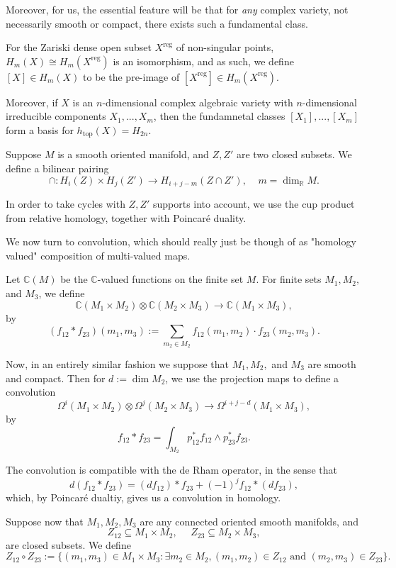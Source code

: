 \documentclass{memoir}
\newcommand{\w}{\wedge}
\newcommand{\bc}{\mathbb{C}}
\newcommand{\br}{\mathbb{R}}
\newcommand{\tx}{\text}
\newcommand{\ten}{\otimes}
\theoremstyle{definition}
\begin{document}
	Moreover, for us, the essential feature will be that for \emph{any} complex variety, not necessarily smooth or compact, there exists such a fundamental class.  
	
	For the Zariski dense open subset $X^{\tx{reg}}$ of non-singular points, $H_m(X)\cong H_m(X^{\tx{reg}})$ is an isomorphism, and as such, we define $[X]\in H_m(X)$ to be the pre-image of $[X^{\tx{reg}}]\in H_m(X^{\tx{reg}})$. 
	
	Moreover, if $X$ is an $n$-dimensional complex algebraic variety with $n$-dimensional irreducible components $X_1, ..., X_m$, then the fundamnetal classes $[X_1], ..., [X_m]$ form a basis for $h_{\tx{top}}(X)=H_{2n}$.  
	
	Suppose $M$ is a smooth oriented manifold, and $Z, Z'$ are two closed subsets.  
	We define a bilinear pairing 
	$$\cap: H_i(Z)\times H_j(Z')\to H_{i+j-m}(Z\cap Z'), \ \ \ \ \ m=\dim_\br M.$$
	
	In order to take cycles with $Z, Z'$ supports into account, we use the cup product from relative homology, together with Poincar\'e duality.  
	
	We now turn to convolution, which should really just be though of as "homology valued" composition of multi-valued maps.  
	
	Let $\bc(M)$ be the $\bc$-valued functions on the finite set $M$.  
	For finite sets $M_1, M_2,$ and $M_3$, we define
	$$\bc(M_1\times M_2)\ten \bc(M_2\times M_3)\to\bc(M_1\times M_3),$$
	by
	$$(f_{12}\ast f_{23})(m_1, m_3):=\sum_{m_2\in M_2}f_{12}(m_1, m_2)\cdot f_{23}(m_2, m_3).$$
	
	Now, in an entirely similar fashion we suppose that $M_1, M_2,$ and $M_3$ are smooth and compact.  
	Then for $d:=\dim M_2$, we use the projection maps to define a convolution 
	$$\Omega^i(M_1\times M_2)\ten\Omega^j(M_2\times M_3)\to\Omega^{i+j-d}(M_1\times M_3),$$
	by
	$$f_{12}\ast f_{23}=\int_{M_2}p_{12}^\ast f_{12}\w p_{23}^\ast f_{23}.$$
	
	The convolution is compatible with the de Rham operator, in the sense that 
	$$d(f_{12}\ast f_{23})=(df_{12})\ast f_{23}+(-1)^jf_{12}\ast (df_{23}),$$
	which, by Poincar\'e dualtiy, gives us a convolution in homology. 
	
	Suppose now that $M_1, M_2, M_3$ are any connected oriented smooth manifolds, and
	$$Z_{12}\subseteq M_1\times M_2, \ \ \ \ \ \ Z_{23}\subseteq M_2\times M_3,$$
	are closed subsets.  
	We define
	$$Z_{12}\circ Z_{23}:=\{(m_1, m_3)\in M_1\times M_3 : \exists m_2\in M_2, (m_1, m_2)\in Z_{12} \tx{ and } (m_2, m_3)\in Z_{23}\}.$$
	
\end{document}
